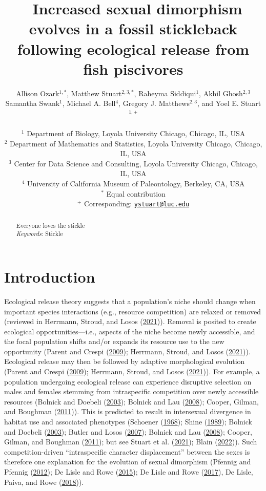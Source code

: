 \documentclass[
  12pt,
]{article}
\title{~\Large Increased sexual dimorphism evolves in a fossil
stickleback following ecological release from fish piscivores}
\author{\large Allison Ozark\(^{1,*}\), Matthew Stuart\(^{2,3,*}\),
Raheyma Siddiqui\(^1\), Akhil Ghosh\(^{2,3}\)\\
\large Samantha Swank\(^1\), Michael A. Bell\(^4\), Gregory J.
Matthews\(^{2,3}\), and Yoel E. Stuart\(^{1,+}\)\\
\vspace{-1.1mm}\\
\large \(^1\) Department of Biology, Loyola University Chicago, Chicago,
IL, USA \vspace{-1.1mm}\\
\large \(^2\) Department of Mathematics and Statistics, Loyola
University Chicago, Chicago, IL, USA \vspace{-1.1mm}\\
\large \(^3\) Center for Data Science and Consulting, Loyola University
Chicago, Chicago, IL, USA \vspace{-1.1mm}\\
\large \(^4\) University of California Museum of Paleontology, Berkeley,
CA, USA \vspace{-1.1mm}\\
\large \(^*\) Equal contribution \vspace{-1.1mm}\\
\large \(^+\) Corresponding:
\href{mailto:ystuart@luc.edu}{\nolinkurl{ystuart@luc.edu}}
\vspace{-1.1mm}}
\date{}
\begin{document}
\maketitle
\begin{abstract}
Everyone loves the stickle \vspace{2mm}\\
\emph{Keywords}: Stickle
\end{abstract}

\newcommand{\iid}{\overset{iid}{\sim}}

\newpage

\hypertarget{sec:intro}{%
\section{Introduction}\label{sec:intro}}

Ecological release theory suggests that a population's niche should
change when important species interactions (e.g., resource competition)
are relaxed or removed (reviewed in Herrmann, Stroud, and Losos
(\protect\hyperlink{ref-Herrmannetal2021}{2021})). Removal is posited to
create ecological opportunities---i.e., aspects of the niche become
newly accessible, and the focal population shifts and/or expands its
resource use to the new opportunity (Parent and Crespi
(\protect\hyperlink{ref-ParentandCrespi2009}{2009}); Herrmann, Stroud,
and Losos (\protect\hyperlink{ref-Herrmannetal2021}{2021})). Ecological
release may then be followed by adaptive morphological evolution (Parent
and Crespi (\protect\hyperlink{ref-ParentandCrespi2009}{2009});
Herrmann, Stroud, and Losos
(\protect\hyperlink{ref-Herrmannetal2021}{2021})). For example, a
population undergoing ecological release can experience disruptive
selection on males and females stemming from intraspecific competition
over newly accessible resources (Bolnick and Doebeli
(\protect\hyperlink{ref-BolnickandDoebeli2003}{2003}); Bolnick and Lau
(\protect\hyperlink{ref-BolnickandLau2008}{2008}); Cooper, Gilman, and
Boughman (\protect\hyperlink{ref-Cooperetal2011}{2011})). This is
predicted to result in intersexual divergence in habitat use and
associated phenotypes (Schoener
(\protect\hyperlink{ref-Schoener1968}{1968}); Shine
(\protect\hyperlink{ref-Shine1989}{1989}); Bolnick and Doebeli
(\protect\hyperlink{ref-BolnickandDoebeli2003}{2003}); Butler and Losos
(\protect\hyperlink{ref-Butleretal2007}{2007}); Bolnick and Lau
(\protect\hyperlink{ref-BolnickandLau2008}{2008}); Cooper, Gilman, and
Boughman (\protect\hyperlink{ref-Cooperetal2011}{2011}); but see Stuart
et al. (\protect\hyperlink{ref-Stuartetal2021}{2021}); Blain
(\protect\hyperlink{ref-Blain2022}{2022})). Such competition-driven
``intraspecific character displacement'' between the sexes is therefore
one explanation for the evolution of sexual dimorphism (Pfennig and
Pfennig (\protect\hyperlink{ref-PfennigandPfennig2012}{2012}); De Lisle
and Rowe (\protect\hyperlink{ref-DeLisleandRowe2015}{2015}); De Lisle
and Rowe (\protect\hyperlink{ref-DeLisleandRowe2017}{2017}), De Lisle,
Paiva, and Rowe (\protect\hyperlink{ref-DeLisleetal2018}{2018})).
\end{document}
